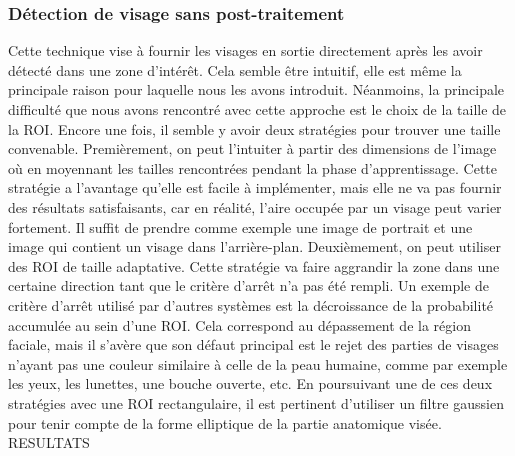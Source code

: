 \documentclass[a4paper,11pt]{article}
\begin{document}
\subsubsection{Détection de visage sans post-traitement}
Cette technique vise à fournir les visages en sortie directement après les avoir détecté dans une zone d'intérêt.
Cela semble être intuitif, elle est même la principale raison pour laquelle nous les avons introduit.
Néanmoins, la principale difficulté que nous avons rencontré avec cette approche est le choix de la taille de la ROI.
Encore une fois, il semble y avoir deux stratégies pour trouver une taille convenable.
\newline
Premièrement, on peut l'intuiter à partir des dimensions de l'image où en moyennant les tailles rencontrées pendant la phase d'apprentissage.
Cette stratégie a l'avantage qu'elle est facile à implémenter, mais elle ne va pas fournir des résultats satisfaisants, car en réalité, l'aire occupée par un visage peut varier fortement.
Il suffit de prendre comme exemple une image de portrait et une image qui contient un visage dans l'arrière-plan.
\newline
Deuxièmement, on peut utiliser des ROI de taille adaptative. 
Cette stratégie va faire aggrandir la zone dans une certaine direction tant que le critère d'arrêt n'a pas été rempli.
Un exemple de critère d'arrêt utilisé par d'autres systèmes est la décroissance de la probabilité accumulée au sein d'une ROI.
Cela correspond au dépassement de la région faciale, mais il s'avère que son défaut principal est le rejet des parties de visages n'ayant pas une couleur similaire à celle de la peau humaine, comme par exemple les yeux, les lunettes, une bouche ouverte, etc.
\newline
\newline
En poursuivant une de ces deux stratégies avec une ROI rectangulaire, il est pertinent d'utiliser un filtre gaussien pour tenir compte de la forme elliptique de la partie anatomique visée.
RESULTATS
\end{document}
